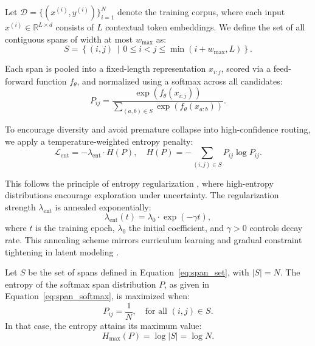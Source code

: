 Let \(\mathcal{D} = \{(x^{(i)}, y^{(i)})\}_{i=1}^N\) denote the training corpus, where each input \(x^{(i)} \in \mathbb{R}^{L \times d}\) consists of \(L\) contextual token embeddings. We define the set of all contiguous spans of width at most \(w_{\max}\) as:
\begin{equation}
S = \left\{(i,j) \,\middle|\, 0 \le i < j \le \min(i + w_{\max}, L) \right\}.
\label{eq:contigous_span_set}
\end{equation}

Each span is pooled into a fixed-length representation \(x_{i:j}\), scored via a feed-forward function \(f_\theta\), and normalized using a softmax across all candidates:
\begin{equation}
P_{ij} = \frac{\exp(f_\theta(x_{i:j}))}{\sum_{(a,b)\in S} \exp(f_\theta(x_{a:b}))}.
\label{eq:span_softmax}
\end{equation}

To encourage diversity and avoid premature collapse into high-confidence routing, we apply a temperature-weighted entropy penalty:
\begin{equation}
\mathcal{L}_{\mathrm{ent}} = -\lambda_{\mathrm{ent}} \cdot H(P), \quad
H(P) = -\sum_{(i,j)\in S} P_{ij} \log P_{ij}.
\label{eq:entropy_term}
\end{equation}

This follows the principle of entropy regularization \cite{grandvalet2005semi, pereyra2017regularizing}, where high-entropy distributions encourage exploration under uncertainty. The regularization strength \(\lambda_{\mathrm{ent}}\) is annealed exponentially:
\begin{equation}
\lambda_{\mathrm{ent}}(t) = \lambda_0 \cdot \exp(-\gamma t),
\label{eq:entropy_decay}
\end{equation}
where \(t\) is the training epoch, \(\lambda_0\) the initial coefficient, and \(\gamma > 0\) controls decay rate. This annealing scheme mirrors curriculum learning and gradual constraint tightening in latent modeling \cite{bengio2009curriculum, kreutzer2021distilling}.

\vspace{1em}
\begin{proposition}
\label{prop:span_entropy_bound}
Let \(S\) be the set of spans defined in Equation~\eqref{eq:span_set}, with \(|S| = N\). The entropy of the softmax span distribution \(P\), as given in Equation~\eqref{eq:span_softmax}, is maximized when:
\begin{equation}
P_{ij} = \frac{1}{N}, \quad \text{for all } (i,j) \in S.
\label{eq:uniform_P}
\end{equation}
In that case, the entropy attains its maximum value:
\begin{equation}
H_{\max}(P) = \log |S| = \log N.
\label{eq:max_entropy}
\end{equation}
\end{proposition}

